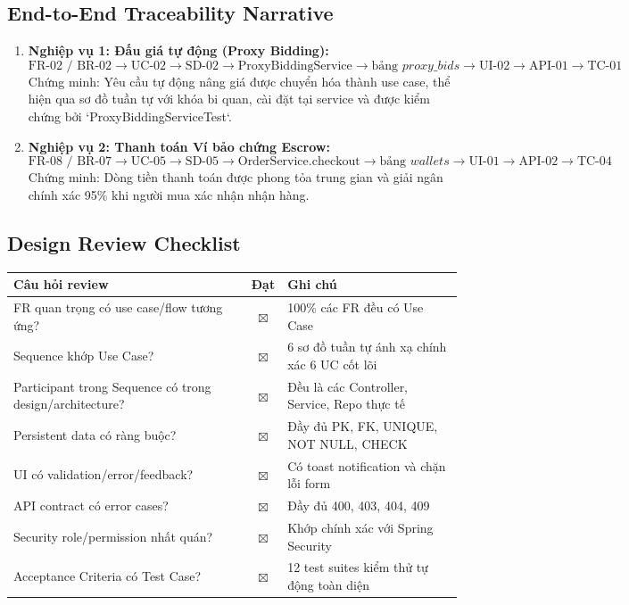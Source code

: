 \documentclass[11pt,a4paper]{article}
\begin{document}
\subsection{End-to-End Traceability Narrative}
\begin{enumerate}[leftmargin=*]
    \item \textbf{Nghiệp vụ 1: Đấu giá tự động (Proxy Bidding):}
    $$\text{FR-02 / BR-02} \longrightarrow \text{UC-02} \longrightarrow \text{SD-02} \longrightarrow \text{ProxyBiddingService} \longrightarrow \text{bảng } proxy\_bids \longrightarrow \text{UI-02} \longrightarrow \text{API-01} \longrightarrow \text{TC-01}$$
    Chứng minh: Yêu cầu tự động nâng giá được chuyển hóa thành use case, thể hiện qua sơ đồ tuần tự với khóa bi quan, cài đặt tại service và được kiểm chứng bởi `ProxyBiddingServiceTest`.
    
    \item \textbf{Nghiệp vụ 2: Thanh toán Ví bảo chứng Escrow:}
    $$\text{FR-08 / BR-07} \longrightarrow \text{UC-05} \longrightarrow \text{SD-05} \longrightarrow \text{OrderService.checkout} \longrightarrow \text{bảng } wallets \longrightarrow \text{UI-01} \longrightarrow \text{API-02} \longrightarrow \text{TC-04}$$
    Chứng minh: Dòng tiền thanh toán được phong tỏa trung gian và giải ngân chính xác 95\% khi người mua xác nhận nhận hàng.
\end{enumerate}

\subsection{Design Review Checklist}
\begin{table}[H]
    \centering
    \small
    \begin{tabularx}{\textwidth}{|X|c|X|}
        \hline
        \textbf{Câu hỏi review} & \textbf{Đạt} & \textbf{Ghi chú} \\ \hline
        FR quan trọng có use case/flow tương ứng? & $\boxtimes$ & 100\% các FR đều có Use Case \\ \hline
        Sequence khớp Use Case? & $\boxtimes$ & 6 sơ đồ tuần tự ánh xạ chính xác 6 UC cốt lõi \\ \hline
        Participant trong Sequence có trong design/architecture? & $\boxtimes$ & Đều là các Controller, Service, Repo thực tế \\ \hline
        Persistent data có ràng buộc? & $\boxtimes$ & Đầy đủ PK, FK, UNIQUE, NOT NULL, CHECK \\ \hline
        UI có validation/error/feedback? & $\boxtimes$ & Có toast notification và chặn lỗi form \\ \hline
        API contract có error cases? & $\boxtimes$ & Đầy đủ 400, 403, 404, 409 \\ \hline
        Security role/permission nhất quán? & $\boxtimes$ & Khớp chính xác với Spring Security \\ \hline
        Acceptance Criteria có Test Case? & $\boxtimes$ & 12 test suites kiểm thử tự động toàn diện \\ \hline
    \end{tabularx}
\end{table}
\end{document}

